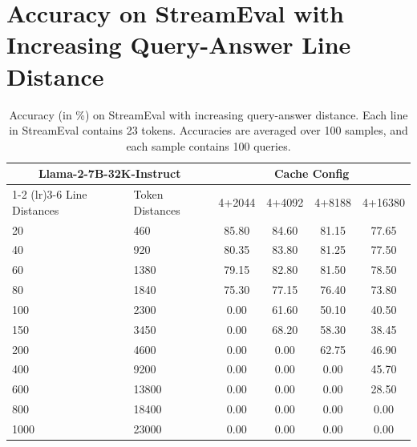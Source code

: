 \documentclass{article} \usepackage{iclr2024_conference,times}
\begin{document}
\section{Accuracy on StreamEval with Increasing Query-Answer Line Distance}
\label{sec:kv_lines}
\begin{table}
    \centering
    \caption{\small Accuracy (in \%) on StreamEval with increasing query-answer distance. Each line in StreamEval contains 23 tokens. Accuracies are averaged over 100 samples, and each sample contains 100 queries.}
    \label{tab:kv_lines}
    \begin{tabular}{llcccc}
        \toprule
        \multicolumn{2}{c}{Llama-2-7B-32K-Instruct} & \multicolumn{4}{c}{Cache Config}                                      \\
        \cmidrule(lr){1-2} \cmidrule(lr){3-6}
        Line Distances                              & Token Distances                  & 4+2044 & 4+4092 & 4+8188 & 4+16380 \\
        \midrule
        20                                          & 460                              & 85.80  & 84.60  & 81.15  & 77.65   \\
        40                                          & 920                              & 80.35  & 83.80  & 81.25  & 77.50   \\
        60                                          & 1380                             & 79.15  & 82.80  & 81.50  & 78.50   \\
        80                                          & 1840                             & 75.30  & 77.15  & 76.40  & 73.80   \\
        100                                         & 2300                             & 0.00   & 61.60  & 50.10  & 40.50   \\
        150                                         & 3450                             & 0.00   & 68.20  & 58.30  & 38.45   \\
        200                                         & 4600                             & 0.00   & 0.00   & 62.75  & 46.90   \\
        400                                         & 9200                             & 0.00   & 0.00   & 0.00   & 45.70   \\
        600                                         & 13800                            & 0.00   & 0.00   & 0.00   & 28.50   \\
        800                                         & 18400                            & 0.00   & 0.00   & 0.00   & 0.00    \\
        1000                                        & 23000                            & 0.00   & 0.00   & 0.00   & 0.00    \\
        \bottomrule
    \end{tabular}
\end{table}
\end{document}
